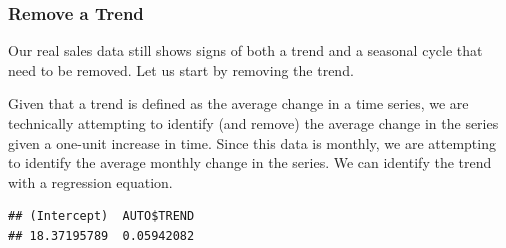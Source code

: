 \documentclass[
]{book}
\newenvironment{Shaded}{\begin{snugshade}}{\end{snugshade}}
\newcommand{\AttributeTok}[1]{\textcolor[rgb]{0.77,0.63,0.00}{#1}}
\newcommand{\DecValTok}[1]{\textcolor[rgb]{0.00,0.00,0.81}{#1}}
\newcommand{\FunctionTok}[1]{\textcolor[rgb]{0.00,0.00,0.00}{#1}}
\newcommand{\NormalTok}[1]{#1}
\newcommand{\OtherTok}[1]{\textcolor[rgb]{0.56,0.35,0.01}{#1}}
\newcommand{\SpecialCharTok}[1]{\textcolor[rgb]{0.00,0.00,0.00}{#1}}
\begin{document}
\hypertarget{remove-a-trend}{%
\subsubsection*{Remove a Trend}\label{remove-a-trend}}

Our real sales data still shows signs of both a trend and a seasonal cycle that need to be removed. Let us start by removing the trend.

Given that a trend is defined as the average change in a time series, we are technically attempting to identify (and remove) the average change in the series given a one-unit increase in time. Since this data is monthly, we are attempting to identify the average monthly change in the series. We can identify the trend with a regression equation.

\begin{Shaded}
\end{Shaded}

\begin{verbatim}
## (Intercept)  AUTO$TREND 
## 18.37195789  0.05942082
\end{verbatim}
\end{document}
